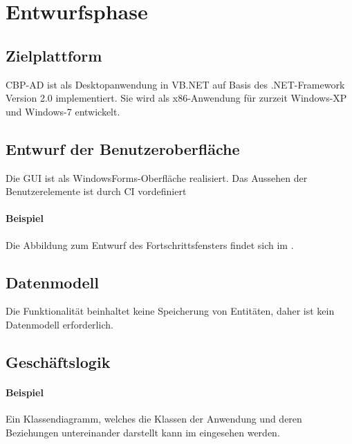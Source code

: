 
\section{Entwurfsphase} 
\label{sec:Entwurfsphase}

\subsection{Zielplattform}
\label{sec:Zielplattform}

\ac{CBP-AD} ist als Desktopanwendung in \acs{VB}.NET auf Basis des .NET-Framework Version 2.0 implementiert.
Sie wird als x86-Anwendung für zurzeit Windows-XP und Windows-7 entwickelt.


\subsection{Entwurf der Benutzeroberfläche}
\label{sec:Benutzeroberflaeche}

Die \acs{GUI} ist als WindowsForms-Oberfläche realisiert. Das Aussehen der Benutzerelemente ist durch \ac{CI} vordefiniert

\paragraph{Beispiel}
Die Abbildung zum Entwurf des Fortschrittsfensters findet sich im . 

\subsection{Datenmodell}
\label{sec:Datenmodell}

Die Funktionalität \gqq{\titel} beinhaltet keine Speicherung von Entitäten, daher ist kein Datenmodell erforderlich.


\subsection{Geschäftslogik}
\label{sec:Geschaeftslogik}

\paragraph{Beispiel}
Ein Klassendiagramm, welches die Klassen der Anwendung und deren Beziehungen untereinander darstellt kann im  eingesehen werden.

